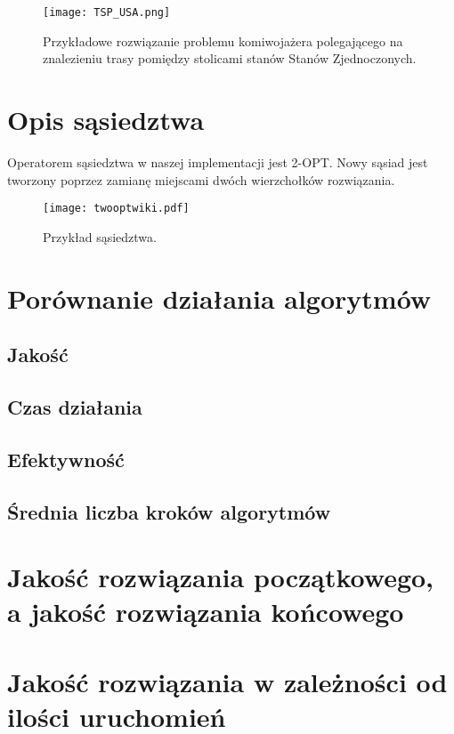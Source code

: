 \documentclass{article}
\begin{document}
\begin{figure} 
\begin{center}
\texttt{[image: TSP\_USA.png]}
\end{center}
\caption{Przykładowe rozwiązanie problemu komiwojażera polegającego na znalezieniu trasy pomiędzy stolicami stanów Stanów Zjednoczonych.}
\label{fig:schemat}
\end{figure}


\section{Opis sąsiedztwa}

Operatorem sąsiedztwa w naszej implementacji jest 2-OPT. Nowy sąsiad jest tworzony poprzez zamianę miejscami dwóch wierzchołków rozwiązania. 

\begin{figure} 
\begin{center}
\texttt{[image: twooptwiki.pdf]}
\end{center}
\caption{Przykład sąsiedztwa.}
\label{fig:schemat}
\end{figure}


\section{Porównanie działania algorytmów}


\subsection{Jakość}
\subsection{Czas działania}
\subsection{Efektywność}
\subsection{Średnia liczba kroków algorytmów}


\section{Jakość rozwiązania początkowego, a jakość rozwiązania końcowego}
\section{Jakość rozwiązania w zależności od ilości uruchomień}
\end{document}
